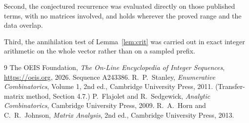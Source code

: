 \documentclass[11pt,a4paper]{article}
\theoremstyle{plain}
\theoremstyle{definition}
\begin{document}
Second, the conjectured recurrence was evaluated directly on those published terms, with no
matrices involved, and holds wherever the proved range and the data overlap.

Third, the annihilation test of Lemma~\ref{lem:crit} was carried out in exact integer
arithmetic on the whole vector rather than on a sampled prefix.

\begin{thebibliography}{9}
 The OEIS Foundation, \emph{The On-Line Encyclopedia of Integer
Sequences}, \url{https://oeis.org}, 2026. Sequence A243386.
 R.~P.~Stanley, \emph{Enumerative Combinatorics}, Volume 1, 2nd ed.,
Cambridge University Press, 2011. (Transfer-matrix method, Section 4.7.)
 P.~Flajolet and R.~Sedgewick, \emph{Analytic Combinatorics}, Cambridge
University Press, 2009.
 R.~A.~Horn and C.~R.~Johnson, \emph{Matrix Analysis}, 2nd ed., Cambridge
University Press, 2013.
\end{thebibliography}
\end{document}
